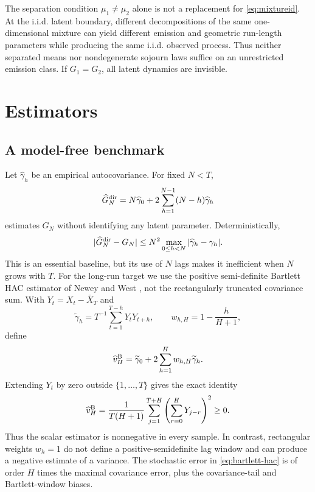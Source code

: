 \documentclass[11pt]{article}
\theoremstyle{definition}
\theoremstyle{remark}
\begin{document}
The separation condition $\mu_1\ne\mu_2$ alone is not a replacement for
\eqref{eq:mixtureid}.  At the i.i.d. latent boundary, different decompositions
of the same one-dimensional mixture can yield different emission and
geometric run-length parameters while producing the same i.i.d. observed
process.  Thus neither separated means nor nondegenerate sojourn laws suffice
on an unrestricted emission class.  If $G_1=G_2$, all latent dynamics are
invisible.

\section{Estimators}

\subsection{A model-free benchmark}

Let $\widehat\gamma_h$ be an empirical autocovariance.  For fixed $N<T$,
\begin{equation}
 \widehat G_N^{\rm dir}
 =N\widehat\gamma_0+2\sum_{h=1}^{N-1}(N-h)\widehat\gamma_h
 \label{eq:direct}
\end{equation}
estimates $G_N$ without identifying any latent parameter.  Deterministically,
\begin{equation}
 |\widehat G_N^{\rm dir}-G_N|
 \le N^2\max_{0\le h<N}|\widehat\gamma_h-\gamma_h|.
 \label{eq:directerror}
\end{equation}
This is an essential baseline, but its use of $N$ lags makes it inefficient
when $N$ grows with $T$.  For the long-run target we use the positive
semi-definite Bartlett HAC estimator of Newey and West
\cite{NeweyWest1987}, not the rectangularly truncated covariance sum.  With
$Y_t=X_t-\bar X_T$ and
\[
 \widetilde\gamma_h=T^{-1}\sum_{t=1}^{T-h}Y_tY_{t+h},
 \qquad
 w_{h,H}=1-\frac{h}{H+1},
\]
define
\begin{equation}
 \widehat v_H^{\rm B}
 =\widetilde\gamma_0+
 2\sum_{h=1}^{H}w_{h,H}\widetilde\gamma_h.
 \label{eq:bartlett-hac}
\end{equation}
Extending $Y_t$ by zero outside $\{1,\ldots,T\}$ gives the exact identity
\begin{equation}
 \widehat v_H^{\rm B}
 =\frac{1}{T(H+1)}
   \sum_{j=1}^{T+H}\left(\sum_{r=0}^{H}Y_{j-r}\right)^2\geq0.
 \label{eq:bartlett-psd}
\end{equation}
Thus the scalar estimator is nonnegative in every sample.  In contrast,
rectangular weights $w_h=1$ do not define a positive-semidefinite lag window
and can produce a negative estimate of a variance.  The stochastic error in
\eqref{eq:bartlett-hac} is of order $H$ times the maximal covariance error,
plus the covariance-tail and Bartlett-window biases.
\end{document}
